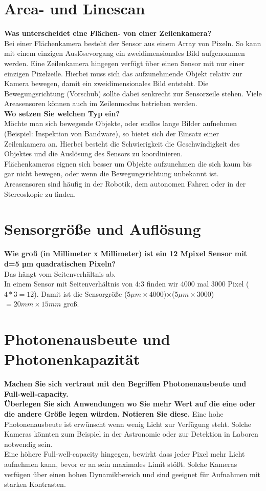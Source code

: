 \documentclass[a4paper]{article}
\begin{document}
	\section{Area- und Linescan}
	\textbf{Was unterscheidet eine Flächen- von einer Zeilenkamera?}\\
	Bei einer Flächenkamera besteht der Sensor aus einem Array von Pixeln. So kann mit einem einzigen Auslösevorgang ein zweidimensionales Bild aufgenommen werden. Eine Zeilenkamera hingegen verfügt über einen Sensor mit nur einer einzigen Pixelzeile. Hierbei muss sich das aufzunehmende Objekt relativ zur Kamera bewegen, damit ein zweidimensionales Bild entsteht. Die Bewegungsrichtung (Vorschub) sollte dabei senkrecht zur Sensorzeile stehen. Viele Areasensoren können auch im Zeilenmodus betrieben werden.\\
	\textbf{Wo setzen Sie welchen Typ ein?}\\
	Möchte man sich bewegende Objekte, oder endlos lange Bilder aufnehmen (Beispiel: Inspektion von Bandware), so bietet sich der Einsatz einer Zeilenkamera an. Hierbei besteht die Schwierigkeit die Geschwindigkeit des Objektes und die Auslösung des Sensors zu koordinieren.\\
	Flächenkameras eignen sich besser um Objekte aufzunehmen die sich kaum bis gar nicht bewegen, oder wenn die Bewegungsrichtung unbekannt ist. Areasensoren sind häufig in der Robotik, dem autonomen Fahren oder in der Stereoskopie zu finden.
	
	\section{Sensorgröße und Auflösung}
	\textbf{Wie groß (in Millimeter x Millimeter) ist ein 12 Mpixel Sensor mit d=5 µm quadratischen
	Pixeln?}\\
	Das hängt vom Seitenverhältnis ab.\\In einem Sensor mit Seitenverhältnis von 4:3 finden wir 4000 mal 3000 Pixel ($4*3=12$). Damit ist die Sensorgröße ($5\mu m\times 4000$)$\times$($5\mu m\times 3000$)$=20mm \times 15mm$ groß.
	
	\section{Photonenausbeute und Photonenkapazität}
	\textbf{Machen Sie sich vertraut mit den Begriffen Photonenausbeute und Full-well-capacity.}\\
	\textbf{Überlegen Sie sich Anwendungen wo Sie mehr Wert auf die eine oder die andere Größe
	legen würden. Notieren Sie diese.}
	Eine hohe Photonenausbeute ist erwünscht wenn wenig Licht zur Verfügung steht. Solche Kameras könnten zum Beispiel in der Astronomie oder zur Detektion in Laboren notwendig sein.\\
	Eine höhere Full-well-capacity hingegen, bewirkt dass jeder Pixel mehr Licht aufnehmen kann, bevor er an sein maximales Limit stößt. Solche Kameras verfügen über einen hohen Dynamikbereich und sind geeignet für Aufnahmen mit starken Kontrasten.
	
\end{document}
